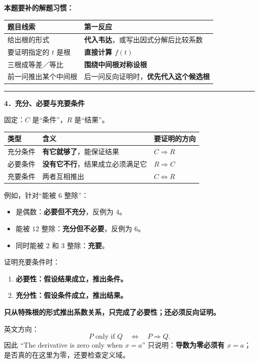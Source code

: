\documentclass[
  UTF8]{ctexart}
\providecommand{\tightlist}{%
  \setlength{\itemsep}{0pt}\setlength{\parskip}{0pt}}
\begin{document}
\textbf{本题要补的解题习惯：}

\begin{longtable}[]{@{}ll@{}}
\toprule\noalign{}
题目线索 & 第一反应 \\
\midrule\noalign{}
\endhead
\bottomrule\noalign{}
\endlastfoot
给出根的形式 & \textbf{代入韦达}，或写出因式分解后比较系数 \\
要证明指定的 \(t\) 是根 & \textbf{直接计算 \(f(t)\)} \\
三根成等差／等比 & \textbf{围绕中间根对称设根} \\
前一问推出某个中间根 & 后一问反向证明时，\textbf{优先代入这个候选根} \\
\end{longtable}

\begin{center}\rule{0.5\linewidth}{0.5pt}\end{center}

\textbf{4．充分、必要与充要条件}

固定：\(C\) 是``条件''，\(R\) 是``结果''。

\begin{longtable}[]{@{}lll@{}}
\toprule\noalign{}
类型 & 含义 & 要证明的方向 \\
\midrule\noalign{}
\endhead
\bottomrule\noalign{}
\endlastfoot
充分条件 & \textbf{有它就够了}，能保证结果 & \(C\Rightarrow R\) \\
必要条件 & \textbf{没有它不行}，结果成立必须满足它 &
\(R\Rightarrow C\) \\
充要条件 & 两者互相推出 & \(C\Longleftrightarrow R\) \\
\end{longtable}

例如，针对``能被 \(6\) 整除''：

\begin{itemize}
\tightlist
\item
  是偶数：\textbf{必要但不充分}，反例为 \(4\)。
\item
  能被 \(12\) 整除：\textbf{充分但不必要}，反例为 \(6\)。
\item
  同时能被 \(2\) 和 \(3\) 整除：\textbf{充要}。
\end{itemize}

证明充要条件时：

\begin{enumerate}
\def\labelenumi{\arabic{enumi}.}
\tightlist
\item
  \textbf{必要性：假设结果成立，推出条件。}
\item
  \textbf{充分性：假设条件成立，推出结果。}
\end{enumerate}

\textbf{只从特殊根的形式推出系数关系，只完成了必要性；还必须反向证明。}

英文方向： \[
\boxed{P\text{ only if }Q\quad\Longleftrightarrow\quad P\Rightarrow Q}.
\] 因此 ``The derivative is zero only when \(x=a\)''
只说明：\textbf{导数为零必须有
\(x=a\)}；是否真的在这里为零，还要检查定义域。
\end{document}
